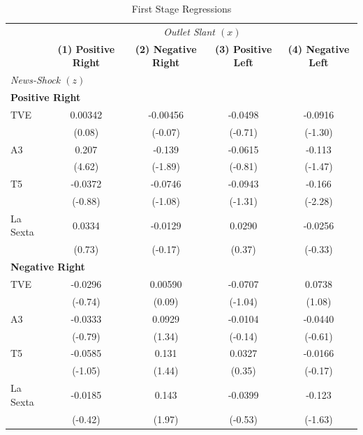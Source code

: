 \documentclass[12pt]{article}
\begin{document}
	\begin{table}[htbp]
		\centering
		\scriptsize
		\setlength{\tabcolsep}{4pt}
		\renewcommand{\arraystretch}{0.9}
		\caption{First Stage Regressions}
		\label{tab:first_stage}
		\begin{tabular}{lcccc}
			\hline
			\multicolumn{1}{c}{} & \multicolumn{4}{c}{\textit{Outlet Slant $(x)$}} \\ 
			\cline{2-5}
			& \textbf{(1) Positive Right}
			& \textbf{(2) Negative Right}
			& \textbf{(3) Positive Left}
			& \textbf{(4) Negative Left} \\
			\hline
			
			\multicolumn{5}{l}{\textit{News‐Shock $(z)$}}\\
			\hline
			
			\multicolumn{5}{l}{\textbf{Positive Right}}\\
			\hline
			TVE            &  0.00342         & -0.00456         & -0.0498         & -0.0916         \\
			&  (0.08)          & (-0.07)          & (-0.71)         & (-1.30)         \\
			A3             &  0.207\sym{***}  & -0.139           & -0.0615         & -0.113          \\
			&  (4.62)          & (-1.89)          & (-0.81)         & (-1.47)         \\
			T5             & -0.0372          & -0.0746          & -0.0943         & -0.166\sym{*}   \\
			& (-0.88)          & (-1.08)          & (-1.31)         & (-2.28)         \\
			La Sexta       &  0.0334          & -0.0129          &  0.0290         & -0.0256         \\
			&  (0.73)          & (-0.17)          &  (0.37)         & (-0.33)         \\
			\hline
			
			\multicolumn{5}{l}{\textbf{Negative Right}}\\
			\hline
			TVE            & -0.0296          &  0.00590         & -0.0707         &  0.0738         \\
			& (-0.74)          &  (0.09)          & (-1.04)         &  (1.08)         \\
			A3             & -0.0333          &  0.0929          & -0.0104         & -0.0440         \\
			& (-0.79)          &  (1.34)          & (-0.14)         & (-0.61)         \\
			T5             & -0.0585          &  0.131           &  0.0327         & -0.0166         \\
			& (-1.05)          &  (1.44)          &  (0.35)         & (-0.17)         \\
			La Sexta       & -0.0185          &  0.143\sym{*}    & -0.0399         & -0.123          \\
			& (-0.42)          &  (1.97)          & (-0.53)         & (-1.63)         \\
			\hline
			

\end{tabular}
\end{table}
\end{document}
